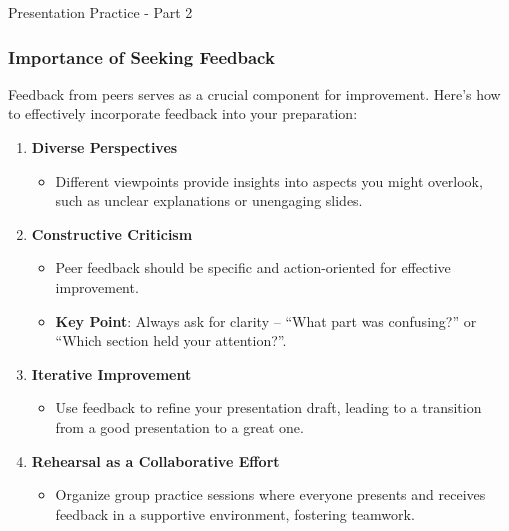 \documentclass[aspectratio=169]{beamer}
\begin{document}
\begin{frame}[fragile]{Presentation Practice - Part 2}
    \frametitle{Importance of Seeking Feedback}
    Feedback from peers serves as a crucial component for improvement. Here's how to effectively incorporate feedback into your preparation:

    \begin{enumerate}
        \item \textbf{Diverse Perspectives}
        \begin{itemize}
            \item Different viewpoints provide insights into aspects you might overlook, such as unclear explanations or unengaging slides.
        \end{itemize}

        \item \textbf{Constructive Criticism}
        \begin{itemize}
            \item Peer feedback should be specific and action-oriented for effective improvement.
            \item \textbf{Key Point}: Always ask for clarity – ``What part was confusing?'' or ``Which section held your attention?''.
        \end{itemize}

        \item \textbf{Iterative Improvement}
        \begin{itemize}
            \item Use feedback to refine your presentation draft, leading to a transition from a good presentation to a great one.
        \end{itemize}

        \item \textbf{Rehearsal as a Collaborative Effort}
        \begin{itemize}
            \item Organize group practice sessions where everyone presents and receives feedback in a supportive environment, fostering teamwork.
        \end{itemize}
    \end{enumerate}
\end{frame}
\end{document}
